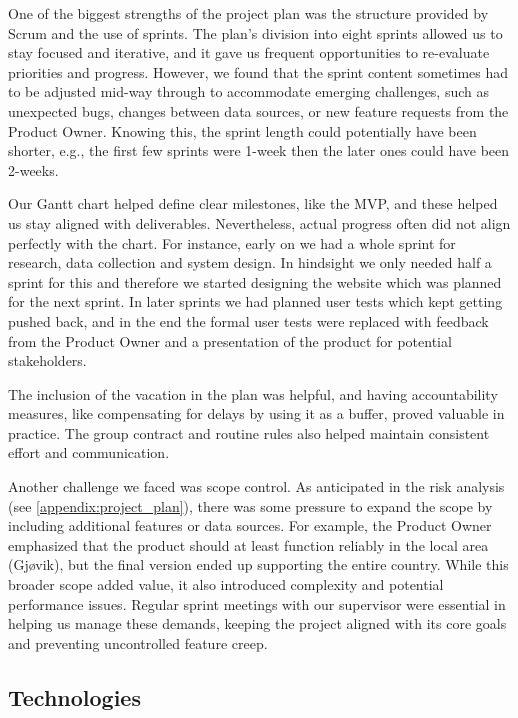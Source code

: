 One of the biggest strengths of the project plan was the structure provided by Scrum and the use of sprints. The plan's division into eight sprints allowed us to stay focused and iterative, and it gave us frequent opportunities to re-evaluate priorities and progress. However, we found that the sprint content sometimes had to be adjusted mid-way through to accommodate emerging challenges, such as unexpected bugs, changes between data sources, or new feature requests from the Product Owner. Knowing this, the sprint length could potentially have been shorter, e.g., the first few sprints were 1-week then the later ones could have been 2-weeks. 

Our Gantt chart helped define clear milestones, like the MVP, and these helped us stay aligned with deliverables. Nevertheless, actual progress often did not align perfectly with the chart. For instance, early on we had a whole sprint for research, data collection and system design. In hindsight we only needed half a sprint for this and therefore we started designing the website which was planned for the next sprint. In later sprints we had planned user tests which kept getting pushed back, and in the end the formal user tests were replaced with feedback from the Product Owner and a presentation of the product for potential stakeholders.

The inclusion of the vacation in the plan was helpful, and having accountability measures, like compensating for delays by using it as a buffer, proved valuable in practice. The group contract and routine rules also helped maintain consistent effort and communication.

Another challenge we faced was scope control. As anticipated in the risk analysis (see \autoref{appendix:project_plan}), there was some pressure to expand the scope by including additional features or data sources. For example, the Product Owner emphasized that the product should at least function reliably in the local area (Gjøvik), but the final version ended up supporting the entire country. While this broader scope added value, it also introduced complexity and potential performance issues. Regular sprint meetings with our supervisor were essential in helping us manage these demands, keeping the project aligned with its core goals and preventing uncontrolled feature creep.

\subsection{Technologies}

